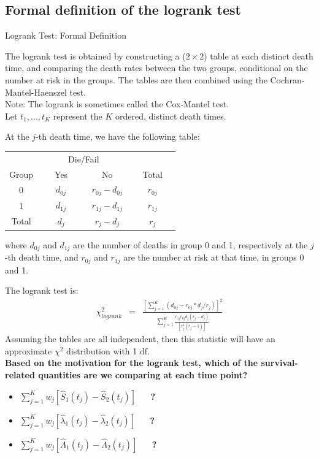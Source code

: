 \documentclass[envcountsect, 10pt, portrait, palatino]{beamer}
\begin{document}
\subsection{Formal definition of the logrank test}
\begin{frame}{ Logrank Test: Formal Definition}

The logrank test is obtained by constructing a ($2 \times 2$) table
at each distinct death time, and comparing the death rates between
the two groups, conditional on the number at risk in the groups.
The tables are then combined using the Cochran-Mantel-Haenszel test.
\\[2ex]
Note: The logrank is sometimes called the Cox-Mantel test.
\\[2ex]
Let $t_1,...,t_K$ represent the $K$ ordered, distinct death times.
\end{frame}
\begin{frame}
At the $j$-th death time, we have the following table:

\begin{center}
\begin{tabular}{cccc}
\hline \hline
& \multicolumn{2}{c}{Die/Fail} & \\ \cline{2-3}
\multicolumn{1}{c}{Group } & ~~~Yes~~~ & ~~~No~~~ & ~~Total~~\\ \hline
0 & $d_{0j}$ & $r_{0j} - d_{0j}$ & $r_{0j}$ \\[2ex]
1 & $d_{1j}$ & $r_{1j} - d_{1j}$ & $r_{1j}$ \\[2ex]
\hline
Total &  $d_j$ & $r_j - d_j$ & $r_j$  \\ \hline \hline
\end{tabular}
\end{center}

where $d_{0j}$ and $d_{1j}$ are the number of deaths in
group 0 and 1, respectively at the $j$-th death time, and
$r_{0j}$ and $r_{1j}$ are the number at risk at that time,
in groups 0 and 1.
\end{frame}
\begin{frame}
The logrank test is:
\begin{eqnarray*}
\chi^2_{logrank} & = &
\frac{[\sum_{j=1}^K (d_{0j} - r_{0j}*d_j/r_j)]^2}
{\sum_{j=1}^K  \frac{r_{1j} r_{0j} d_j (r_j-d_j)}{[r_j^2(r_j-1)]}}
\end{eqnarray*}
Assuming the tables are all independent, then this statistic
will have an approximate $\chi^2$ distribution with 1 df.
\\[2ex]
{\bf Based on the motivation for the logrank test, which of
the survival-related quantities are we comparing at each
time point?}
\begin{itemize}
\item $\sum_{j=1}^K w_j \left[\hat{S}_1(t_j) - \hat{S}_2(t_j)\right]$ ~~ {\bf ?}
\item $\sum_{j=1}^K w_j \left[\hat\lambda_1(t_j) - \hat\lambda_2(t_j)\right]$ ~~ {\bf ?}
\item $\sum_{j=1}^K w_j \left[\hat\Lambda_1(t_j) - \hat\Lambda_2(t_j)\right]$ ~~ {\bf ?}
\end{itemize}
\end{frame}
\end{document}
